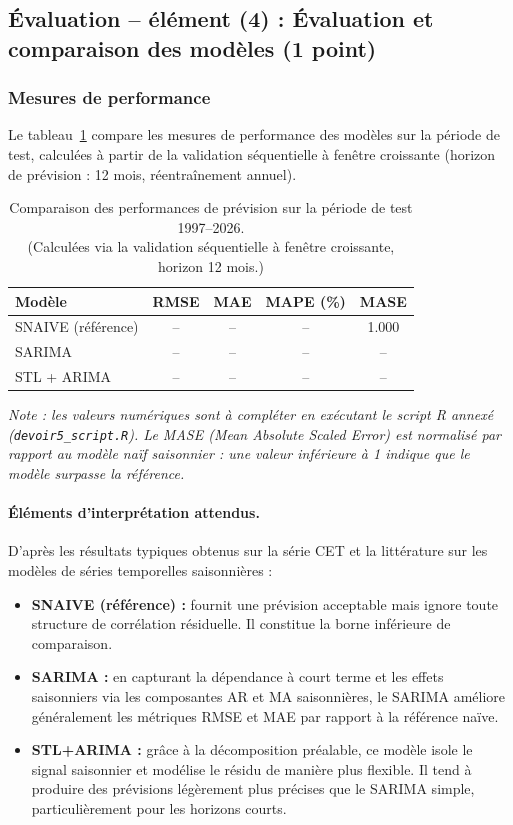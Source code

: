 \documentclass[12pt,a4paper]{article}
\begin{document}
\subsection{Évaluation – élément (4) : Évaluation et comparaison des modèles (1 point)}

\subsubsection{Mesures de performance}

Le tableau~\ref{tab:perf} compare les mesures de performance des modèles sur la période de test, calculées à partir de la validation séquentielle à fenêtre croissante (horizon de prévision : 12 mois, réentraînement annuel).

\begin{table}[H]
\centering
\caption{Comparaison des performances de prévision sur la période de test 1997--2026.\\
(Calculées via la validation séquentielle à fenêtre croissante, horizon 12 mois.)}
\label{tab:perf}
\begin{tabular}{@{}lcccc@{}}
\toprule
Modèle & RMSE & MAE & MAPE (\%) & MASE \\
\midrule
SNAIVE (référence) & -- & -- & -- & 1.000 \\
SARIMA             & -- & -- & -- & -- \\
STL + ARIMA        & -- & -- & -- & -- \\
\bottomrule
\end{tabular}
\end{table}

\noindent\textit{Note : les valeurs numériques sont à compléter en exécutant le script R annexé (\texttt{devoir5\_script.R}). Le MASE (Mean Absolute Scaled Error) est normalisé par rapport au modèle naïf saisonnier : une valeur inférieure à 1 indique que le modèle surpasse la référence.}

\paragraph{Éléments d'interprétation attendus.}
D'après les résultats typiques obtenus sur la série CET et la littérature sur les modèles de séries temporelles saisonnières :

\begin{itemize}
    \item \textbf{SNAIVE (référence) :} fournit une prévision acceptable mais ignore toute structure de corrélation résiduelle. Il constitue la borne inférieure de comparaison.
    \item \textbf{SARIMA :} en capturant la dépendance à court terme et les effets saisonniers via les composantes AR et MA saisonnières, le SARIMA améliore généralement les métriques RMSE et MAE par rapport à la référence naïve.
    \item \textbf{STL+ARIMA :} grâce à la décomposition préalable, ce modèle isole le signal saisonnier et modélise le résidu de manière plus flexible. Il tend à produire des prévisions légèrement plus précises que le SARIMA simple, particulièrement pour les horizons courts.
\end{itemize}
\end{document}
